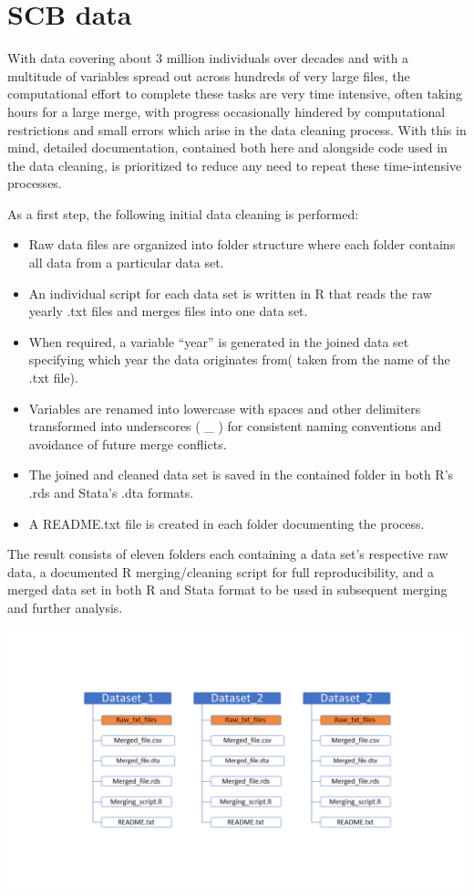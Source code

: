 \documentclass[
]{book}
\providecommand{\tightlist}{%
  \setlength{\itemsep}{0pt}\setlength{\parskip}{0pt}}
\begin{document}
\hypertarget{scb-data}{%
\section{SCB data}\label{scb-data}}

With data covering about 3 million individuals over decades and with a multitude of variables spread out across hundreds of very large files, the computational effort to complete these tasks are very time intensive, often taking hours for a large merge, with progress occasionally hindered by computational restrictions and small errors which arise in the data cleaning process. With this in mind, detailed documentation, contained both here and alongside code used in the data cleaning, is prioritized to reduce any need to repeat these time-intensive processes.

As a first step, the following initial data cleaning is performed:

\begin{itemize}
\tightlist
\item
  Raw data files are organized into folder structure where each folder contains all data from a particular data set.
\item
  An individual script for each data set is written in R that reads the raw yearly .txt files and merges files into one data set.
\item
  When required, a variable ``year'' is generated in the joined data set specifying which year the data originates from( taken from the name of the .txt file).
\item
  Variables are renamed into lowercase with spaces and other delimiters transformed into underscores ( \_ ) for consistent naming conventions and avoidance of future merge conflicts.
\item
  The joined and cleaned data set is saved in the contained folder in both R's .rds and Stata's .dta formats.
\item
  A README.txt file is created in each folder documenting the process.
\end{itemize}

The result consists of eleven folders each containing a data set's respective raw data, a documented R merging/cleaning script for full reproducibility, and a merged data set in both R and Stata format to be used in subsequent merging and further analysis.

\includegraphics[width=1\linewidth]{output/figures/folder_structure}
\end{document}
